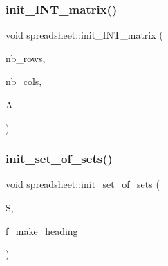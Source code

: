 \mbox{\label{classspreadsheet_adfbf0142e2e06f810de8d6d6f0cfcebf}} 
\subsubsection{\texorpdfstring{init\+\_\+\+I\+N\+T\+\_\+matrix()}{init\_INT\_matrix()}}
{\footnotesize\ttfamily void spreadsheet\+::init\+\_\+\+I\+N\+T\+\_\+matrix (\begin{DoxyParamCaption}\item[{\mbox{\hyperlink{galois_8h_a09fddde158a3a20bd2dcadb609de11dc}{I\+NT}}}]{nb\+\_\+rows,  }\item[{\mbox{\hyperlink{galois_8h_a09fddde158a3a20bd2dcadb609de11dc}{I\+NT}}}]{nb\+\_\+cols,  }\item[{\mbox{\hyperlink{galois_8h_a09fddde158a3a20bd2dcadb609de11dc}{I\+NT}} $\ast$}]{A }\end{DoxyParamCaption})}

\mbox{\label{classspreadsheet_a4c201d5841da9152b0b08cc3f562f303}} 
\subsubsection{\texorpdfstring{init\+\_\+set\+\_\+of\+\_\+sets()}{init\_set\_of\_sets()}}
{\footnotesize\ttfamily void spreadsheet\+::init\+\_\+set\+\_\+of\+\_\+sets (\begin{DoxyParamCaption}\item[{\mbox{\hyperlink{classset__of__sets}{set\+\_\+of\+\_\+sets}} $\ast$}]{S,  }\item[{\mbox{\hyperlink{galois_8h_a09fddde158a3a20bd2dcadb609de11dc}{I\+NT}}}]{f\+\_\+make\+\_\+heading }\end{DoxyParamCaption})}

\mbox{\label{classspreadsheet_acc04b0c07a3f45262eb7accf78d411d4}} 
